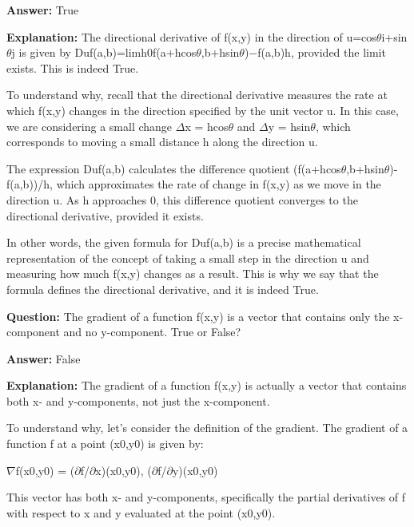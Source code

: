 \documentclass{article}
\begin{document}
                \textbf{Answer:} True

                \textbf{Explanation:} The directional derivative of f(x,y) in the direction of u=cos\ensuremath{\theta}i+sin\ensuremath{\theta}j is given by Duf(a,b)=limh{\textrightarrow}0f(a+hcos\ensuremath{\theta},b+hsin\ensuremath{\theta})\ensuremath{-}f(a,b)h, provided the limit exists. This is indeed True.

To understand why, recall that the directional derivative measures the rate at which f(x,y) changes in the direction specified by the unit vector u. In this case, we are considering a small change \ensuremath{\Delta}x = hcos\ensuremath{\theta} and \ensuremath{\Delta}y = hsin\ensuremath{\theta}, which corresponds to moving a small distance h along the direction u.

The expression Duf(a,b) calculates the difference quotient (f(a+hcos\ensuremath{\theta},b+hsin\ensuremath{\theta})-f(a,b))/h, which approximates the rate of change in f(x,y) as we move in the direction u. As h approaches 0, this difference quotient converges to the directional derivative, provided it exists.

In other words, the given formula for Duf(a,b) is a precise mathematical representation of the concept of taking a small step in the direction u and measuring how much f(x,y) changes as a result. This is why we say that the formula defines the directional derivative, and it is indeed True.
                
                \vspace{0.5cm} 
        
            
                \textbf {Question:} The gradient of a function f(x,y) is a vector that contains only the x-component and no y-component. True or False?
                
                \textbf{Answer:} False

                \textbf{Explanation:} The gradient of a function f(x,y) is actually a vector that contains both x- and y-components, not just the x-component. 

To understand why, let's consider the definition of the gradient. The gradient of a function f at a point (x0,y0) is given by:

\ensuremath{\nabla}f(x0,y0) = (\ensuremath{\partial}f/\ensuremath{\partial}x)(x0,y0), (\ensuremath{\partial}f/\ensuremath{\partial}y)(x0,y0)

This vector has both x- and y-components, specifically the partial derivatives of f with respect to x and y evaluated at the point (x0,y0). 
\end{document}
